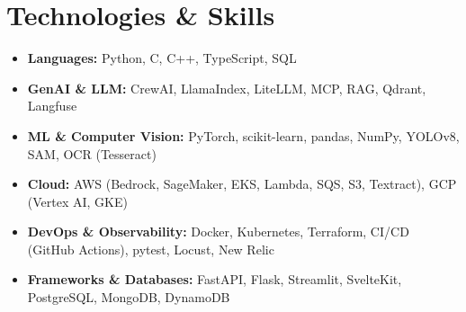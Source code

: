 \documentclass[a4paper,10pt]{article}
\begin{document}
\section{Technologies \& Skills}

\begin{itemize}[noitemsep, topsep=0pt, leftmargin=0pt, label={}]
    \item \textbf{Languages:} Python, C, C++, TypeScript, SQL
    \item \textbf{GenAI \& LLM:} CrewAI, LlamaIndex, LiteLLM, MCP, RAG, Qdrant, Langfuse
    \item \textbf{ML \& Computer Vision:} PyTorch, scikit-learn, pandas, NumPy, YOLOv8, SAM, OCR (Tesseract)
    \item \textbf{Cloud:} AWS (Bedrock, SageMaker, EKS, Lambda, SQS, S3, Textract), GCP (Vertex AI, GKE)
    \item \textbf{DevOps \& Observability:} Docker, Kubernetes, Terraform, CI/CD (GitHub Actions), pytest, Locust, New Relic
    \item \textbf{Frameworks \& Databases:} FastAPI, Flask, Streamlit, SvelteKit, PostgreSQL, MongoDB, DynamoDB
\end{itemize}
\end{document}
